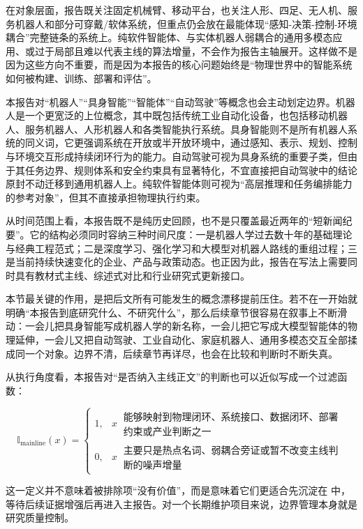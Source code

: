 在对象层面，报告既关注固定机械臂、移动平台，也关注人形、四足、无人机、服务机器人和部分可穿戴/软体系统，但重点仍会放在最能体现“感知-决策-控制-环境耦合”完整链条的系统上。纯软件智能体、与实体机器人弱耦合的通用多模态应用、或过于局部且难以代表主线的算法增量，不会作为报告主轴展开。这样做不是因为这些方向不重要，而是因为本报告的核心问题始终是“物理世界中的智能系统如何被构建、训练、部署和评估”。

本报告对“机器人”“具身智能”“智能体”“自动驾驶”等概念也会主动划定边界。机器人是一个更宽泛的上位概念，其中既包括传统工业自动化设备，也包括移动机器人、服务机器人、人形机器人和各类智能执行系统。具身智能则不是所有机器人系统的同义词，它更强调系统在开放或半开放环境中，通过感知、表示、规划、控制与环境交互形成持续闭环行为的能力。自动驾驶可视为具身系统的重要子类，但由于其任务边界、规则体系和安全约束具有显著特化，不宜直接把自动驾驶中的结论原封不动迁移到通用机器人上。纯软件智能体则可视为“高层推理和任务编排能力的参考对象”，但其不直接承担物理执行约束。

从时间范围上看，本报告既不是纯历史回顾，也不是只覆盖最近两年的“短新闻纪要”。它的结构必须同时容纳三种时间尺度：一是机器人学过去数十年的基础理论与经典工程范式；二是深度学习、强化学习和大模型对机器人路线的重组过程；三是当前持续快速变化的企业、产品与政策动态。也正因为此，报告在写法上需要同时具有教材式主线、综述式对比和行业研究式更新接口。

本节最关键的作用，是把后文所有可能发生的概念漂移提前压住。若不在一开始就明确“本报告到底研究什么、不研究什么”，那么后续章节很容易在叙事上不断滑动：一会儿把具身智能写成机器人学的新名称，一会儿把它写成大模型智能体的物理延伸，一会儿又把自动驾驶、工业自动化、家庭机器人、通用多模态交互全部揉成同一个对象。边界不清，后续章节再详尽，也会在比较和判断时不断失真。

从执行角度看，本报告对“是否纳入主线正文”的判断也可以近似写成一个过滤函数：

\begingroup
\small
\begin{equation*}
\mathbb{I}_{\text{mainline}}(x)=
\begin{cases}
1, & x\ \substack{\text{能够映射到物理闭环、系统接口、数据闭环、部署}\\\text{约束或产业判断之一}}\\0, & x\ \substack{\text{主要只是热点名词、弱耦合旁证或暂不改变主线判}\\\text{断的噪声增量}}
\end{cases}
\end{equation*}
\endgroup

这一定义并不意味着被排除项“没有价值”，而是意味着它们更适合先沉淀在  中，等待后续证据增强后再进入主报告。对一个长期维护项目来说，边界管理本身就是研究质量控制。

